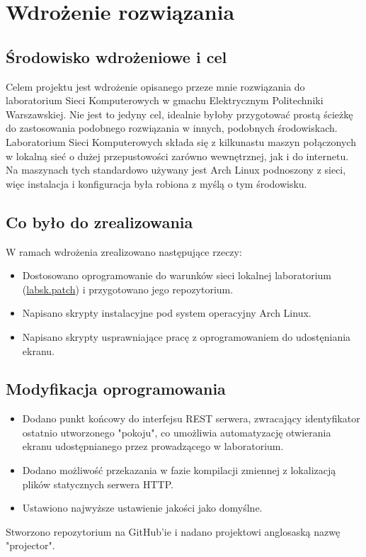 \documentclass[a4paper,11pt]{article}
\begin{document}
    \section{Wdrożenie rozwiązania} 
        \subsection{Środowisko wdrożeniowe i cel}
        Celem projektu jest wdrożenie opisanego przeze mnie rozwiązania do laboratorium Sieci Komputerowych w gmachu Elektrycznym Politechniki Warszawskiej. 
        Nie jest to jedyny cel, idealnie byłoby przygotować prostą ścieżkę do zastosowania podobnego rozwiązania w innych, podobnych środowiskach.    
        Laboratorium Sieci Komputerowych składa się z kilkunastu maszyn połączonych w lokalną sieć o dużej przepustowości zarówno wewnętrznej, jak i do internetu.
        Na maszynach tych standardowo używany jest Arch Linux podnoszony z sieci, więc instalacja i konfiguracja była robiona z myślą o tym środowisku.  
        \subsection{Co było do zrealizowania}
        W ramach wdrożenia zrealizowano następujące rzeczy: 
        \begin{itemize}
            \item Dostosowano oprogramowanie do warunków sieci lokalnej laboratorium (\hyperref[łatka]{labsk.patch}) i przygotowano jego repozytorium.
            \item Napisano skrypty instalacyjne pod system operacyjny Arch Linux.
            \item Napisano skrypty usprawniające pracę z oprogramowaniem do udostęniania ekranu.
        \end{itemize}
        \subsection{Modyfikacja oprogramowania}
        \begin{itemize}
            \item Dodano punkt końcowy do interfejsu REST serwera, zwracający identyfikator ostatnio utworzonego "pokoju", co umożliwia automatyzację otwierania ekranu udostępnianego przez prowadzącego w laboratorium.  
            \item Dodano możliwość przekazania w fazie kompilacji zmiennej z lokalizacją plików statycznych serwera HTTP.
            \item Ustawiono najwyższe ustawienie jakości jako domyślne. 
        \end{itemize}
        Stworzono repozytorium na GitHub'ie\cite{1} i nadano projektowi anglosaską nazwę "projector".
\end{document}
